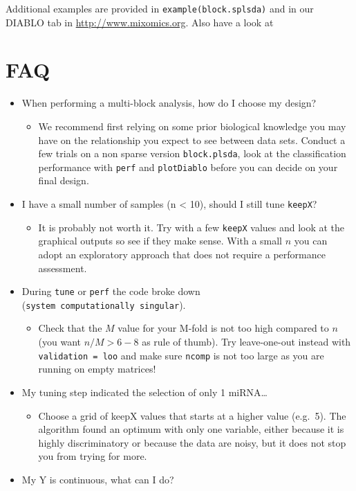 \documentclass[]{book}
\providecommand{\tightlist}{%
  \setlength{\itemsep}{0pt}\setlength{\parskip}{0pt}}
\begin{document}
Additional examples are provided in \texttt{example(block.splsda)} and in our DIABLO tab in \url{http://www.mixomics.org}. Also have a look at \citep{Sin16}

\hypertarget{faq-3}{%
\section{FAQ}\label{faq-3}}

\begin{itemize}
\tightlist
\item
  When performing a multi-block analysis, how do I choose my design?

  \begin{itemize}
  \tightlist
  \item
    We recommend first relying on some prior biological knowledge you may have on the relationship you expect to see between data sets. Conduct a few trials on a non sparse version \texttt{block.plsda}, look at the classification performance with \texttt{perf} and \texttt{plotDiablo} before you can decide on your final design.
  \end{itemize}
\item
  I have a small number of samples (n \textless{} 10), should I still tune \texttt{keepX}?

  \begin{itemize}
  \tightlist
  \item
    It is probably not worth it. Try with a few \texttt{keepX} values and look at the graphical outputs so see if they make sense. With a small \(n\) you can adopt an exploratory approach that does not require a performance assessment.
  \end{itemize}
\item
  During \texttt{tune} or \texttt{perf} the code broke down (\texttt{system\ computationally\ singular}).

  \begin{itemize}
  \tightlist
  \item
    Check that the \(M\) value for your M-fold is not too high compared to \(n\) (you want \(n/M > 6 - 8\) as rule of thumb). Try leave-one-out instead with \texttt{validation\ =\ \textquotesingle{}loo\textquotesingle{}} and make sure \texttt{ncomp} is not too large as you are running on empty matrices!
  \end{itemize}
\item
  My tuning step indicated the selection of only 1 miRNA\ldots{}

  \begin{itemize}
  \tightlist
  \item
    Choose a grid of keepX values that starts at a higher value (e.g.~5). The algorithm found an optimum with only one variable, either because it is highly discriminatory or because the data are noisy, but it does not stop you from trying for more.
  \end{itemize}
\item
  My Y is continuous, what can I do?


\end{itemize}
\end{document}
